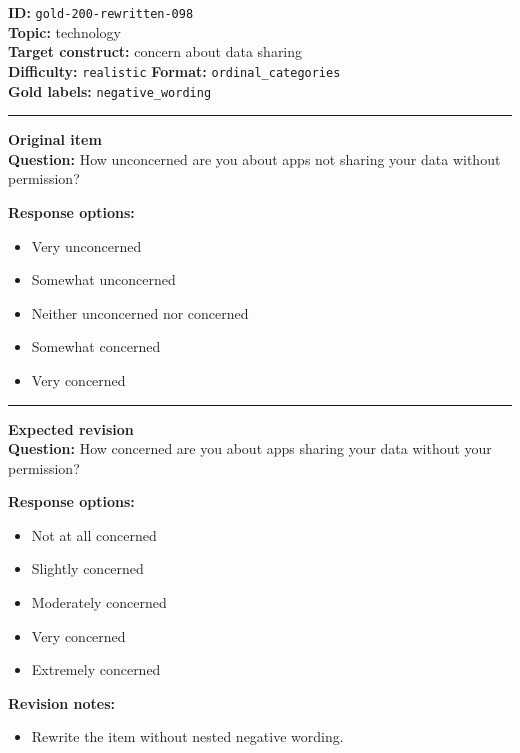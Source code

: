 \documentclass[10pt,a4paper]{article}
\newcommand{\sectionline}{\vspace{0.15em}\hrule\vspace{0.35em}}
\begin{document}
\begin{tcolorbox}[colframe=FlawRed,colback=white,colbacktitle=FlawRed!9,coltitle=black,title={Item 098\hfill Flawed item}]
\textbf{ID:} \texttt{gold-200-rewritten-098}\\
\textbf{Topic:} technology\\
\textbf{Target construct:} concern about data sharing\\
\textbf{Difficulty:} \texttt{realistic} \quad \textbf{Format:} \texttt{ordinal\_categories}\\
\textbf{Gold labels:} \texttt{negative\_wording}\\
\sectionline
\textbf{Original item}\\
\textbf{Question:} How unconcerned are you about apps not sharing your data without permission?
\par\textbf{Response options:}
\begin{itemize}
\item Very unconcerned
\item Somewhat unconcerned
\item Neither unconcerned nor concerned
\item Somewhat concerned
\item Very concerned
\end{itemize}
\sectionline
\textbf{Expected revision}\\
\textbf{Question:} How concerned are you about apps sharing your data without your permission?
\par\textbf{Response options:}
\begin{itemize}
\item Not at all concerned
\item Slightly concerned
\item Moderately concerned
\item Very concerned
\item Extremely concerned
\end{itemize}
\par\textbf{Revision notes:}
\begin{itemize}
\item Rewrite the item without nested negative wording.
\end{itemize}
\end{tcolorbox}
\end{document}
